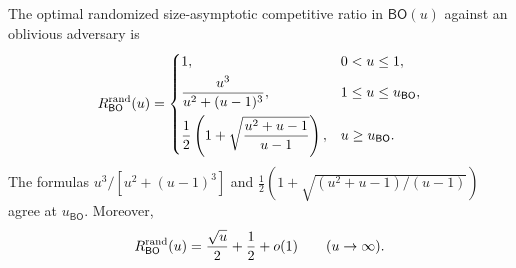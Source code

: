\begin{theorem}
\label{thm:bo-curve}
The optimal randomized size-asymptotic competitive ratio in
$\mathsf{BO}(u)$ against an oblivious adversary is
\begin{equation}
 R_{\mathsf{BO}}^{\mathrm{rand}}(u)=
 \begin{cases}
  1,&0<u\le1,\\[3pt]
  \displaystyle\frac{u^3}{u^2+(u-1)^3},
    &1\le u\le u_{\mathsf{BO}},\\[9pt]
  \displaystyle\frac12\left(
      1+\sqrt{\frac{u^2+u-1}{u-1}}\right),
    &u\ge u_{\mathsf{BO}}.
 \end{cases}
 \label{eq:bo-curve}
\end{equation}
The formulas $u^3/[u^2+(u-1)^3]$ and
$\frac12(1+\sqrt{(u^2+u-1)/(u-1)})$ agree at
$u_{\mathsf{BO}}$.  Moreover,
\begin{equation}
 R_{\mathsf{BO}}^{\mathrm{rand}}(u)=\frac{\sqrt u}{2}+\frac12+o(1)
 \qquad (u\to\infty).
 \label{eq:bo-curve-asymptotic}
\end{equation}
\end{theorem}

